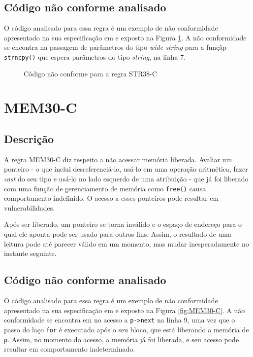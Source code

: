 \subsection{Código não conforme analisado}

O código analisado para essa regra é um exemplo de não conformidade apresentado na sua especificação em \cite{ccert} e exposto na Figura \ref{fig:STR38-C}. A não conformidade se encontra na passagem de parâmetros do tipo \textit{wide string} para a funçãp \texttt{strncpy()} que espera parâmetros do tipo \textit{string}, na linha 7.

\begin{figure}[h!]
  \centering
  
  \caption{Código não conforme para a regra STR38-C}
\label{fig:STR38-C}
\end{figure}

\section{MEM30-C}
\subsection{Descrição}

A regra MEM30-C diz respeito a não acessar memória liberada. Avaliar um ponteiro - o que inclui desreferenciá-lo, usá-lo em uma operação aritmética, fazer \textit{cast} do seu tipo e usá-lo no lado esquerdo de uma atribuição - que já foi liberado com uma função de gerenciamento de memória como \texttt{free()} causa comportamento indefinido. O acesso a esses ponteiros pode resultar em vulnerabilidades.

Após ser liberado, um ponteiro se torna inválido e o espaço de endereço para o qual ele aponta pode ser usado para outros fins. Assim, o resultado de uma leitura pode até parecer válido em um momento, mas mudar inesperadamente no instante seguinte.

\subsection{Código não conforme analisado}

O código analisado para essa regra é um exemplo de não conformidade apresentado na sua especificação em \cite{ccert} e exposto na Figura \ref{fig:MEM30-C}. A não conformidade se encontra em no acesso a \texttt{p->next} na linha 9, uma vez que o passo do laço \texttt{for} é executado após o seu bloco, que está liberando a memória de \texttt{p}. Assim, no momento do acesso, a memória já foi liberada, e seu acesso pode resultar em comportamento indeterminado.

